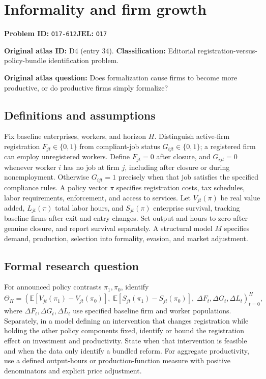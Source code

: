 \documentclass[11pt,a4paper]{article}
\begin{document}
\section*{Informality and firm growth}
\textbf{Problem ID:} \texttt{O17-612}\quad \textbf{JEL:} \texttt{O17}\par
\label{problem:OP-0034}
\label{audited:ECON-071}

\label{atlas:prob:D4}
\noindent\textbf{Original atlas ID:} D4 (entry 34). \textbf{Classification:} Editorial registration-versus-policy-bundle identification problem.

\noindent\textbf{Original atlas question:} Does formalization cause firms to become more productive, or do productive firms simply formalize?

\subsection*{Definitions and assumptions}
Fix baseline enterprises, workers, and horizon $H$. Distinguish active-firm registration $F_{jt}\in\{0,1\}$ from compliant-job status $G_{ijt}\in\{0,1\}$; a registered firm can employ unregistered workers. Define $F_{jt}=0$ after closure, and $G_{ijt}=0$ whenever worker $i$ has no job at firm $j$, including after closure or during nonemployment. Otherwise $G_{ijt}=1$ precisely when that job satisfies the specified compliance rules. A policy vector $\pi$ specifies registration costs, tax schedules, labor requirements, enforcement, and access to services. Let $V_{jt}(\pi)$ be real value added, $L_{jt}(\pi)$ total labor hours, and $S_{jt}(\pi)$ enterprise survival, tracking baseline firms after exit and entry changes. Set output and hours to zero after genuine closure, and report survival separately. A structural model $M$ specifies demand, production, selection into formality, evasion, and market adjustment.
\subsection*{Formal research question}
For announced policy contrasts $\pi_1,\pi_0$, identify
\[
 \Theta_H=\left(
 \mathbb E[V_{jt}(\pi_1)-V_{jt}(\pi_0)],\;
 \mathbb E[S_{jt}(\pi_1)-S_{jt}(\pi_0)],\;
 \Delta F_t,\Delta G_t,\Delta L_t\right)_{t=0}^H,
\]
where $\Delta F_t,\Delta G_t,\Delta L_t$ use specified baseline firm and worker populations. Separately, in a model defining an intervention that changes registration while holding the other policy components fixed, identify or bound the registration effect on investment and productivity. State when that intervention is feasible and when the data only identify a bundled reform. For aggregate productivity, use a defined output-hours or production-function measure with positive denominators and explicit price adjustment.
\end{document}
